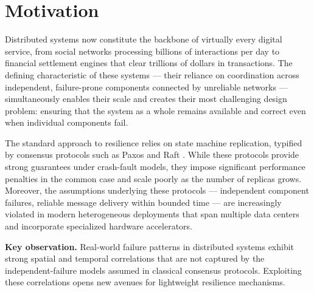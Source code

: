 \section{Motivation}

Distributed systems now constitute the backbone of virtually every digital service, from social networks processing billions of interactions per day to financial settlement engines that clear trillions of dollars in transactions. The defining characteristic of these systems --- their reliance on coordination across independent, failure-prone components connected by unreliable networks --- simultaneously enables their scale and creates their most challenging design problem: ensuring that the system as a whole remains available and correct even when individual components fail.

The standard approach to resilience relies on state machine replication, typified by consensus protocols such as Paxos \cite{lamport2001} and Raft \cite{ongaro2014}. While these protocols provide strong guarantees under crash-fault models, they impose significant performance penalties in the common case and scale poorly as the number of replicas grows. Moreover, the assumptions underlying these protocols --- independent component failures, reliable message delivery within bounded time --- are increasingly violated in modern heterogeneous deployments that span multiple data centers and incorporate specialized hardware accelerators.

\begin{notebox}
\textbf{Key observation.} Real-world failure patterns in distributed systems exhibit strong spatial and temporal correlations that are not captured by the independent-failure models assumed in classical consensus protocols. Exploiting these correlations opens new avenues for lightweight resilience mechanisms.
\end{notebox}
